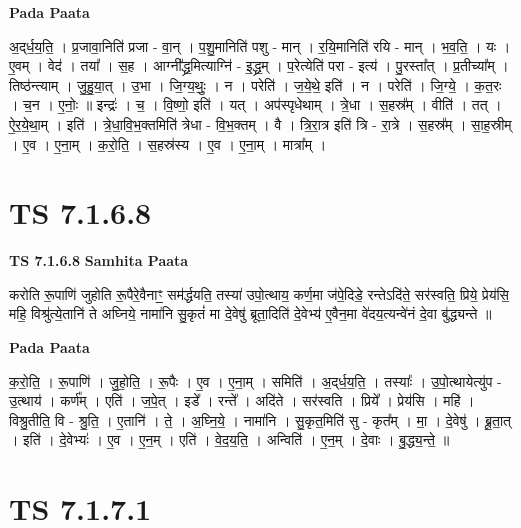 \documentclass[17pt]{extarticle}
\begin{document}
\textbf{Pada Paata} \newline

अ॒द्‌र्ध॒य॒ति॒ । प्र॒जावा॒निति॑ प्रजा - वा॒न् । प॒शु॒मानिति॑ पशु - मान् । र॒यि॒मानिति॑ रयि - मान् । भ॒व॒ति॒ । यः । ए॒वम् । वेद॑ । तया᳚ । स॒ह । आग्नी᳚द्ध्र॒मित्याग्नि॑ - इ॒द्ध्र॒म् । प॒रेत्येति॑ परा - इत्य॑ । पु॒रस्ता᳚त् । प्र॒तीच्या᳚म् । तिष्ठ॑न्त्याम् । जु॒हु॒या॒त् । उ॒भा । जि॒ग्य॒थुः॒ । न । परेति॑ । ज॒ये॒थे॒ इति॑ । न । परेति॑ । जि॒ग्ये॒ । क॒त॒रः । च॒न । ए॒नोः॒ ॥ इन्द्रः॑ । च॒ । वि॒ष्णो॒ इति॑ । यत् । अप॑स्पृधेथाम् । त्रे॒धा । स॒हस्र᳚म् । वीति॑ । तत् । ऐ॒र॒ये॒था॒म् । इति॑ । त्रे॒धा॒वि॒भ॒क्तमिति॑ त्रेधा - वि॒भ॒क्तम् । वै । त्रि॒रा॒त्र इति॑ त्रि - रा॒त्रे । स॒हस्र᳚म् । सा॒ह॒स्रीम् । ए॒व । ए॒ना॒म् । क॒रो॒ति॒ । स॒हस्र॑स्य । ए॒व । ए॒ना॒म् । मात्रा᳚म् ।  \newline




\section*{ TS 7.1.6.8 }

\textbf{TS 7.1.6.8 } \newline
\textbf{Samhita Paata} \newline

करोति रू॒पाणि॑ जुहोति रू॒पैरे॒वैनाꣳ॒॒ सम॑र्द्धयति॒ तस्या॑ उपो॒त्थाय॒ कर्ण॒मा ज॑पे॒दिडे॒ रन्तेऽदि॑ते॒ सर॑स्वति॒ प्रिये॒ प्रेय॑सि॒ महि॒ विश्रु॑त्ये॒तानि॑ ते अघ्निये॒ नामा॑नि सु॒कृतं॑ मा दे॒वेषु॑ ब्रूता॒दिति॑ दे॒वेभ्य॑ ए॒वैन॒मा वे॑दय॒त्यन्वे॑नं दे॒वा बु॑द्ध्यन्ते ॥ \newline

\textbf{Pada Paata} \newline

क॒रो॒ति॒ । रू॒पाणि॑ । जु॒हो॒ति॒ । रू॒पैः । ए॒व । ए॒ना॒म् । समिति॑ । अ॒द्‌र्ध॒य॒ति॒ । तस्याः᳚ ।      उ॒पो॒त्थायेत्यु॑प - उ॒त्थाय॑ । कर्ण᳚म् । एति॑ । ज॒पे॒त् । इडे᳚ । रन्ते᳚ । अदि॑ते । सर॑स्वति । प्रिये᳚ । प्रेय॑सि । महि॑ । विश्रु॒तीति॒ वि - श्रु॒ति॒ । ए॒तानि॑ । ते॒ । अ॒घ्नि॒ये॒ । नामा॑नि । सु॒कृत॒मिति॑ सु - कृत᳚म् । मा॒ । दे॒वेषु॑ । ब्रू॒ता॒त् । इति॑ । दे॒वेभ्यः॑ । ए॒व । ए॒न॒म् । एति॑ । वे॒द॒य॒ति॒ । अन्विति॑ । ए॒न॒म् । दे॒वाः । बु॒द्ध्य॒न्ते॒ ॥  \newline




\section*{ TS 7.1.7.1 }
\end{document}
